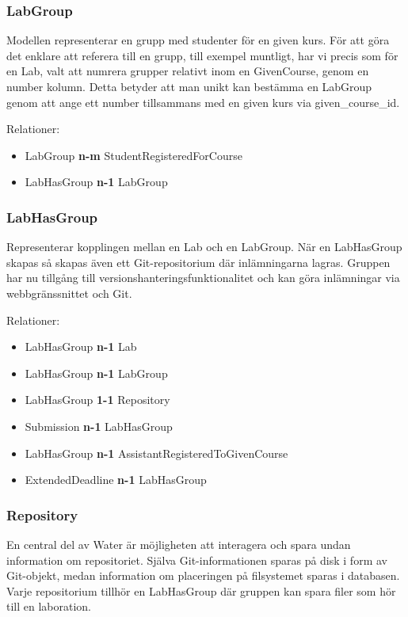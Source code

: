 \subsubsection{LabGroup}
Modellen representerar en grupp med studenter för en given kurs. För att göra det enklare att referera till en grupp, till exempel muntligt, har vi precis som för en Lab, valt att numrera grupper relativt inom en GivenCourse, genom en number kolumn. Detta betyder att man unikt kan bestämma en LabGroup genom att ange ett number tillsammans med en given kurs via given\_course\_id.

Relationer: 
\begin{itemize}
  \item LabGroup {\bf n-m} StudentRegisteredForCourse 
  \item LabHasGroup {\bf n-1} LabGroup
\end{itemize}

\subsubsection{LabHasGroup}\label{sec:modell-labhasgroup}
Representerar kopplingen mellan en Lab och en LabGroup. När en LabHasGroup skapas så skapas även ett Git-repositorium där inlämningarna lagras. Gruppen har nu tillgång till versionshanteringsfunktionalitet och kan göra inlämningar via webbgränssnittet och Git.

Relationer: 
\begin{itemize}
  \item LabHasGroup {\bf n-1} Lab 
  \item LabHasGroup {\bf n-1} LabGroup
  \item LabHasGroup {\bf 1-1} Repository
  \item Submission {\bf n-1} LabHasGroup
  \item LabHasGroup {\bf n-1} AssistantRegisteredToGivenCourse
  \item ExtendedDeadline {\bf n-1} LabHasGroup

\end{itemize}

\subsubsection{Repository}
En central del av Water är möjligheten att interagera och spara undan information om repositoriet. Själva Git-informationen sparas på disk i form av Git-objekt, medan information om placeringen på filsystemet sparas i databasen. Varje repositorium tillhör en LabHasGroup där gruppen kan spara filer som hör till en laboration.

